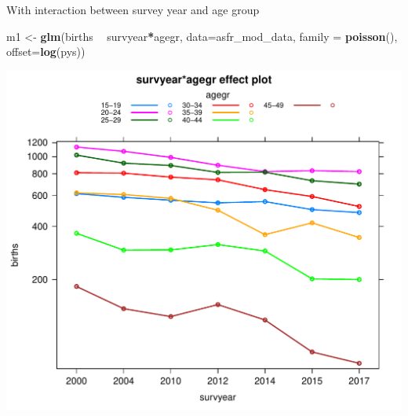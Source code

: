 \documentclass[]{article}
\newenvironment{Shaded}{\begin{snugshade}}{\end{snugshade}}
\newcommand{\KeywordTok}[1]{\textcolor[rgb]{0.13,0.29,0.53}{\textbf{#1}}}
\newcommand{\DataTypeTok}[1]{\textcolor[rgb]{0.13,0.29,0.53}{#1}}
\newcommand{\StringTok}[1]{\textcolor[rgb]{0.31,0.60,0.02}{#1}}
\newcommand{\OperatorTok}[1]{\textcolor[rgb]{0.81,0.36,0.00}{\textbf{#1}}}
\newcommand{\NormalTok}[1]{#1}
\begin{document}
With interaction between survey year and age group

\begin{Shaded}
\begin{Highlighting}[]

\NormalTok{m1 <-}\StringTok{ }\KeywordTok{glm}\NormalTok{(births }\OperatorTok{~}\StringTok{ }\NormalTok{survyear}\OperatorTok{*}\NormalTok{agegr, }\DataTypeTok{data=}\NormalTok{asfr_mod_data, }\DataTypeTok{family =} \KeywordTok{poisson}\NormalTok{(), }\DataTypeTok{offset=}\KeywordTok{log}\NormalTok{(pys))}
\end{Highlighting}
\end{Shaded}

\includegraphics{test_vignette_files/figure-latex/unnamed-chunk-6-1.pdf}
\end{document}
